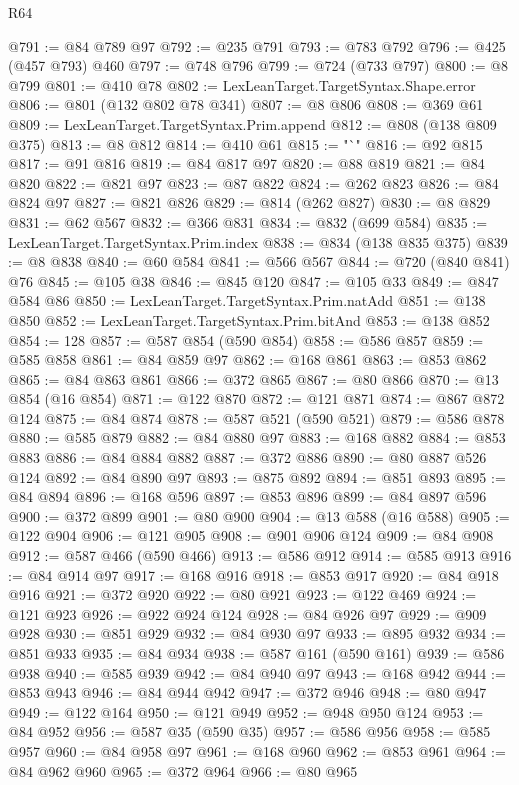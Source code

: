 \begin{lexlean}{R64}
\begin{coremodule}
@791 := @84 @789 @97
@792 := @235 @791
@793 := @783 @792
@796 := @425 (@457 @793) @460
@797 := @748 @796
@799 := @724 (@733 @797)
@800 := @8 @799
@801 := @410 @78
@802 := LexLeanTarget.TargetSyntax.Shape.error
@806 := @801 (@132 @802 @78 @341)
@807 := @8 @806
@808 := @369 @61
@809 := LexLeanTarget.TargetSyntax.Prim.append
@812 := @808 (@138 @809 @375)
@813 := @8 @812
@814 := @410 @61
@815 := "`"
@816 := @92 @815
@817 := @91 @816
@819 := @84 @817 @97
@820 := @88 @819
@821 := @84 @820
@822 := @821 @97
@823 := @87 @822
@824 := @262 @823
@826 := @84 @824 @97
@827 := @821 @826
@829 := @814 (@262 @827)
@830 := @8 @829
@831 := @62 @567
@832 := @366 @831
@834 := @832 (@699 @584)
@835 := LexLeanTarget.TargetSyntax.Prim.index
@838 := @834 (@138 @835 @375)
@839 := @8 @838
@840 := @60 @584
@841 := @566 @567
@844 := @720 (@840 @841) @76
@845 := @105 @38
@846 := @845 @120
@847 := @105 @33
@849 := @847 @584 @86
@850 := LexLeanTarget.TargetSyntax.Prim.natAdd
@851 := @138 @850
@852 := LexLeanTarget.TargetSyntax.Prim.bitAnd
@853 := @138 @852
@854 := 128
@857 := @587 @854 (@590 @854)
@858 := @586 @857
@859 := @585 @858
@861 := @84 @859 @97
@862 := @168 @861
@863 := @853 @862
@865 := @84 @863 @861
@866 := @372 @865
@867 := @80 @866
@870 := @13 @854 (@16 @854)
@871 := @122 @870
@872 := @121 @871
@874 := @867 @872 @124
@875 := @84 @874
@878 := @587 @521 (@590 @521)
@879 := @586 @878
@880 := @585 @879
@882 := @84 @880 @97
@883 := @168 @882
@884 := @853 @883
@886 := @84 @884 @882
@887 := @372 @886
@890 := @80 @887 @526 @124
@892 := @84 @890 @97
@893 := @875 @892
@894 := @851 @893
@895 := @84 @894
@896 := @168 @596
@897 := @853 @896
@899 := @84 @897 @596
@900 := @372 @899
@901 := @80 @900
@904 := @13 @588 (@16 @588)
@905 := @122 @904
@906 := @121 @905
@908 := @901 @906 @124
@909 := @84 @908
@912 := @587 @466 (@590 @466)
@913 := @586 @912
@914 := @585 @913
@916 := @84 @914 @97
@917 := @168 @916
@918 := @853 @917
@920 := @84 @918 @916
@921 := @372 @920
@922 := @80 @921
@923 := @122 @469
@924 := @121 @923
@926 := @922 @924 @124
@928 := @84 @926 @97
@929 := @909 @928
@930 := @851 @929
@932 := @84 @930 @97
@933 := @895 @932
@934 := @851 @933
@935 := @84 @934
@938 := @587 @161 (@590 @161)
@939 := @586 @938
@940 := @585 @939
@942 := @84 @940 @97
@943 := @168 @942
@944 := @853 @943
@946 := @84 @944 @942
@947 := @372 @946
@948 := @80 @947
@949 := @122 @164
@950 := @121 @949
@952 := @948 @950 @124
@953 := @84 @952
@956 := @587 @35 (@590 @35)
@957 := @586 @956
@958 := @585 @957
@960 := @84 @958 @97
@961 := @168 @960
@962 := @853 @961
@964 := @84 @962 @960
@965 := @372 @964
@966 := @80 @965

\end{coremodule}
\end{lexlean}
